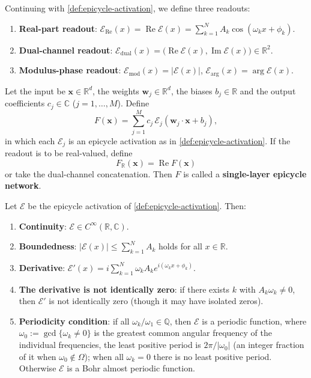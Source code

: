\begin{definition}\label{def:epicycle-readout}
Continuing with \cref{def:epicycle-activation}, we define three readouts:
\begin{enumerate}[label=(\roman*)]
    \item \textbf{Real-part readout}: $\mathcal E_{\mathrm{Re}}(x)=\operatorname{Re}\mathcal E(x)=\sum_{k=1}^{N}A_k\cos(\omega_k x+\phi_k)$.
    \item \textbf{Dual-channel readout}: $\mathcal E_{\mathrm{dual}}(x)=\bigl(\operatorname{Re}\mathcal E(x),\operatorname{Im}\mathcal E(x)\bigr)\in\mathbb R^2$.
    \item \textbf{Modulus-phase readout}: $\mathcal E_{\mathrm{mod}}(x)=|\mathcal E(x)|$, $\mathcal E_{\mathrm{arg}}(x)=\arg\mathcal E(x)$.
\end{enumerate}
\end{definition}

\begin{definition}\label{def:single-layer-epicycle-network}
Let the input be $\mathbf x\in\mathbb R^d$, the weights $\mathbf w_j\in\mathbb R^d$, the biases $b_j\in\mathbb R$ and the output coefficients $c_j\in\mathbb C$ ($j=1,\dots,M$). Define
\[
F(\mathbf x)=\sum_{j=1}^{M}c_j\,\mathcal E_j(\mathbf w_j\cdot\mathbf x+b_j),
\]
in which each $\mathcal E_j$ is an epicycle activation as in \cref{def:epicycle-activation}. If the readout is to be real-valued, define
\[
F_{\mathbb R}(\mathbf x)=\operatorname{Re}F(\mathbf x)
\]
or take the dual-channel concatenation. Then $F$ is called a \textbf{single-layer epicycle network}.
\end{definition}

\begin{proposition}\label{prop:epicycle-basic-properties}
Let $\mathcal E$ be the epicycle activation of \cref{def:epicycle-activation}. Then:
\begin{enumerate}[label=(\roman*)]
    \item \textbf{Continuity}: $\mathcal E\in C^\infty(\mathbb R,\mathbb C)$.
    \item \textbf{Boundedness}: $|\mathcal E(x)|\le \sum_{k=1}^{N}A_k$ holds for all $x\in\mathbb R$.
    \item \textbf{Derivative}: $\mathcal E'(x)=i\sum_{k=1}^{N}\omega_k A_k e^{i(\omega_k x+\phi_k)}$.
    \item \textbf{The derivative is not identically zero}: if there exists $k$ with $A_k\omega_k\neq 0$, then $\mathcal E'$ is not identically zero (though it may have isolated zeros).
    \item \textbf{Periodicity condition}: if all $\omega_k/\omega_1\in\mathbb Q$, then $\mathcal E$ is a periodic function, where $\omega_0:=\gcd\{\omega_k\ne0\}$ is the greatest common angular frequency of the individual frequencies, the least positive period is $2\pi/\lvert\omega_0\rvert$ (an integer fraction of it when $\omega_0\notin\Omega$); when all $\omega_k=0$ there is no least positive period. Otherwise $\mathcal E$ is a Bohr almost periodic function.
\end{enumerate}
\end{proposition}

